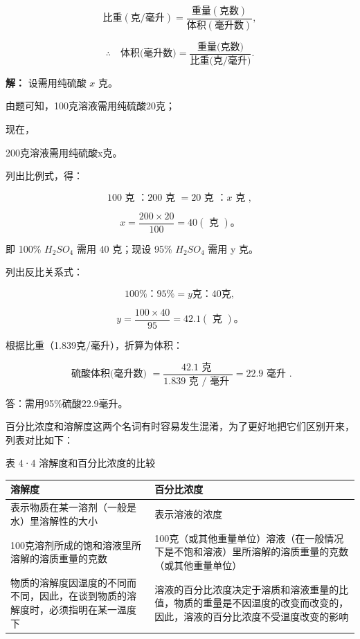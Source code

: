 \[
\mathrm{比重(克/毫升)} = \frac {\mathrm{重量(克数)}}{\mathrm{体积(毫升数)}},
\]

\[
\therefore \quad \text{体积(毫升数)} = \frac {\text{重量(克数)}}{\text{比重(克/毫升)}}.
\]

\textbf{解：} 设需用纯硫酸 \(x\) 克。

由题可知，100克溶液需用纯硫酸20克；

现在，

200克溶液需用纯硫酸x克。

列出比例式，得：

\[
100 \text{ 克 }\text{：} 200 \text{ 克 } = 20 \text{ 克 }\text{：} x \text{ 克 },
\]

\[
x = \frac {200 \times 20}{100} = 40 (\text{ 克 })\text{。}
\]

即 100\% \(H_{2}SO_{4}\) 需用 40 克；现设 95\% \(H_{2}SO_{4}\) 需用 y
克。

列出反比关系式：

\[
100\%\text{：}95\% = y \text{克}\text{：}40\text{克},
\]

\[
y = \frac {100 \times 40}{95} = 42.1 (\text{ 克 })\text{。}
\]

根据比重（1.839克/毫升），折算为体积：

\[
\text{ 硫酸体积(毫升数) } = \frac {42.1 \text{ 克 }}{1.839 \text{ 克 / 毫升 }} = 22.9 \text{ 毫升 }.
\]

答：需用95\%硫酸22.9毫升。

百分比浓度和溶解度这两个名词有时容易发生混淆，为了更好地把它们区别开来，列表对比如下：

表 4·4 溶解度和百分比浓度的比较

{\def\LTcaptype{none} %
\begin{longtable}[]{@{}
  >{\raggedright\arraybackslash}p{}
  >{\raggedright\arraybackslash}p{}@{}}
\toprule\noalign{}
\begin{minipage}[b]{\linewidth}\raggedright
溶解度
\end{minipage} & \begin{minipage}[b]{\linewidth}\raggedright
百分比浓度
\end{minipage} \\
\midrule\noalign{}
\endhead
\bottomrule\noalign{}
\endlastfoot
表示物质在某一溶剂（一般是水）里溶解性的大小 & 表示溶液的浓度 \\
100克溶剂所成的饱和溶液里所溶解的溶质重量的克数 &
100克（或其他重量单位）溶液（在一般情况下是不饱和溶液）里所溶解的溶质重量的克数（或其他重量单位） \\
物质的溶解度因温度的不同而不同，因此，在谈到物质的溶解度时，必须指明在某一温度下
&
溶液的百分比浓度决定于溶质和溶液重量的比值，物质的重量是不因温度的改变而改变的，因此，溶液的百分比浓度不受温度改变的影响 \\
\end{longtable}
}

